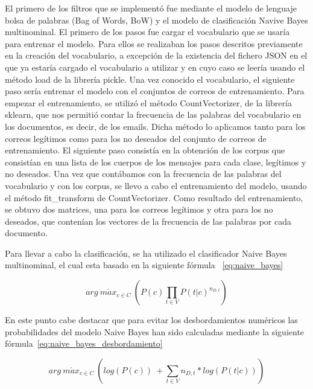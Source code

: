 \documentclass[conference,a4paper]{IEEEtran}
\begin{document}
El primero de los filtros que se implementó fue mediante el modelo de lenguaje bolsa de palabras (Bag of Words, BoW) y el modelo de clasificación Navive Bayes multinominal. El primero de los pasos fue cargar el vocabulario que se usaría para entrenar el modelo. Para ellos se realizaban los pasos descritos previamente en la creación del vocabulario, a excepción de la existencia del fichero JSON en el que ya estaría cargado el vocabulario a utilizar y en cuyo caso se leería usando el método load de la librería pickle. Una vez conocido el vocabulario, el siguiente paso sería entrenar el modelo con el conjuntos de correos de entrenamiento. Para empezar el entrenamiento, se utilizó el método CountVectorizer, de la librería sklearn, que nos permitió contar la frecuencia de las palabras del vocabulario en los documentos, es decir, de los emails. Dicha método lo aplicamos tanto para los correos legítimos como para los no deseados del conjunto de correos de entrenamiento. El siguiente paso consistía en la obtención de los corpus que consistían en una lista de los cuerpos de los mensajes para cada clase, legítimos y no deseados. Una vez que contábamos con la frecuencia de las palabras del vocabulario y con los corpus, se llevo a cabo el entrenamiento del modelo, usando el método fit\_transform de CountVectorizer. Como resultado del entrenamiento, se obtuvo dos matrices, una para los correos legítimos y otra para los no deseados, que contenían los vectores de la frecuencia de las palabras por cada documento.

Para llevar a cabo la clasificación, se ha utilizado el clasificador Naive Bayes multinominal, el cual esta basado en la siguiente fórmula ~\eqref{eq:naive_bayes}

\begin{center}
\begin{equation}
  \label{eq:naive_bayes}
  arg \ m\acute{a}x_{c \in C} \ (P(c) \prod_{t \in 	V} P(t|c)^{n_{D,t}})
\end{equation}
\end{center}

En este punto cabe destacar que para evitar los desbordamientos numéricos las probabilidades del modelo Naive Bayes han sido calculadas mediante la siguiente fórmula~\eqref{eq:naive_bayes_desbordamiento}

\begin{center}
\begin{equation}
  \label{eq:naive_bayes_desbordamiento}
  arg \ m\acute{a}x_{c \in C} \ (log (P(c)) \ + \sum_{t \in 	V} n_{D,t} * log( P(t|c)))
\end{equation}
\end{center}
\end{document}
